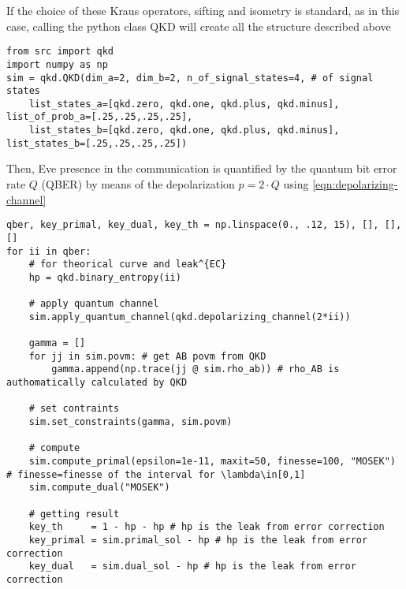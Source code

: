 \documentclass{article}
\begin{document}
    If the choice of these Kraus operators, sifting and isometry is standard, as in this case, calling the python class \textrm{QKD} will create all the structure described above
    \begin{lstlisting}[style=python]
from src import qkd
import numpy as np
sim = qkd.QKD(dim_a=2, dim_b=2, n_of_signal_states=4, # of signal states
    list_states_a=[qkd.zero, qkd.one, qkd.plus, qkd.minus], list_of_prob_a=[.25,.25,.25,.25],
    list_states_b=[qkd.zero, qkd.one, qkd.plus, qkd.minus], list_states_b=[.25,.25,.25,.25])\end{lstlisting}
    Then, Eve presence in the communication is quantified by the quantum bit error rate \(Q\) (QBER) by means of the depolarization \(p=2\cdot Q\) using \eqref{eqn:depolarizing-channel}
    \begin{lstlisting}[style=python]
qber, key_primal, key_dual, key_th = np.linspace(0., .12, 15), [], [], []
for ii in qber:
    # for theorical curve and leak^{EC}
    hp = qkd.binary_entropy(ii) 

    # apply quantum channel
    sim.apply_quantum_channel(qkd.depolarizing_channel(2*ii))

    gamma = []
    for jj in sim.povm: # get AB povm from QKD
        gamma.append(np.trace(jj @ sim.rho_ab)) # rho_AB is authomatically calculated by QKD

    # set contraints
    sim.set_constraints(gamma, sim.povm)

    # compute 
    sim.compute_primal(epsilon=1e-11, maxit=50, finesse=100, "MOSEK") # finesse=finesse of the interval for \lambda\in[0,1] 
    sim.compute_dual("MOSEK")

    # getting result
    key_th     = 1 - hp - hp # hp is the leak from error correction
    key_primal = sim.primal_sol - hp # hp is the leak from error correction
    key_dual   = sim.dual_sol - hp # hp is the leak from error correction \end{lstlisting}
\end{document}
